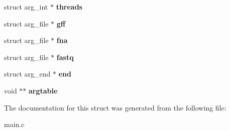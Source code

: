 \begin{DoxyCompactItemize}
struct arg\+\_\+int $\ast$ {\bfseries threads}
\item 
\mbox{\label{structarg__parameters_adf9e1f5b281cb3c17abeeb3150ad2e25}} 
struct arg\+\_\+file $\ast$ {\bfseries gff}
\item 
\mbox{\label{structarg__parameters_a54cd66b63eb8e26be1371784eb778cac}} 
struct arg\+\_\+file $\ast$ {\bfseries fna}
\item 
\mbox{\label{structarg__parameters_a2dd93f256ed7b20ee699e8ebfcf92246}} 
struct arg\+\_\+file $\ast$ {\bfseries fastq}
\item 
\mbox{\label{structarg__parameters_af43939056eba3201c35d1b9fc88d225b}} 
struct arg\+\_\+end $\ast$ {\bfseries end}
\item 
\mbox{\label{structarg__parameters_a70fd68158adb5081c65c2a50734f23bd}} 
void $\ast$$\ast$ {\bfseries argtable}
\end{DoxyCompactItemize}


The documentation for this struct was generated from the following file\+:\begin{DoxyCompactItemize}
\item 
main.\+c\end{DoxyCompactItemize}
